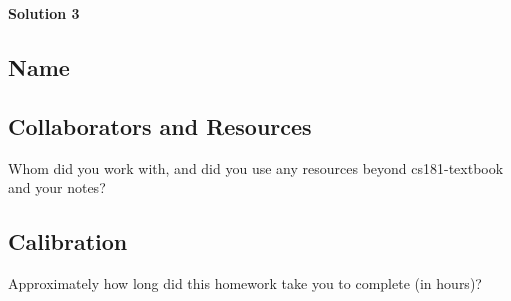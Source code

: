 \documentclass[submit]{harvardml}
\begin{document}
\textbf{Solution 3}

\begin{figure}[H]
    \centering
    \hfill
\end{figure}

\newpage
\newpage

\subsection*{Name}

\subsection*{Collaborators and Resources}
Whom did you work with, and did you use any resources beyond cs181-textbook and your notes?

\subsection*{Calibration}
Approximately how long did this homework take you to complete (in hours)? 
\end{document}
